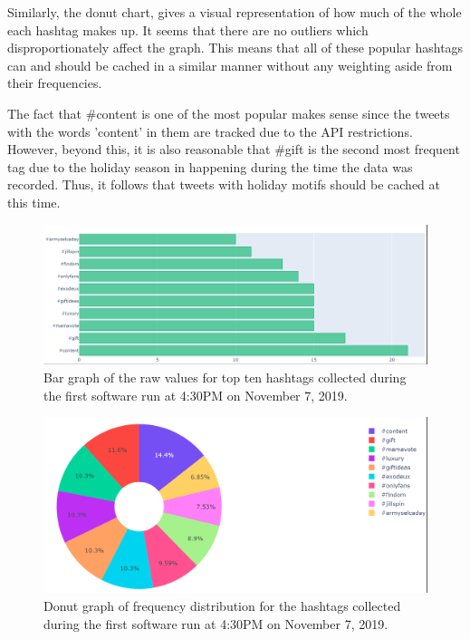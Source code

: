 \documentclass[conference]{IEEEtran}
\begin{document}
Similarly, the donut chart, gives a visual representation of how much of the whole each hashtag makes up. It seems that there are no outliers which disproportionately affect the graph. This means that all of these popular hashtags can and should be cached in a similar manner without any weighting aside from their frequencies. \par

The fact that \#content is one of the most popular makes sense since the tweets with the words 'content' in them are tracked due to the API restrictions. However, beyond this, it is also reasonable that \#gift is the second most frequent tag due to the holiday season in happening during the time the data was recorded. Thus, it follows that tweets with holiday motifs should be cached at this time. \par

\begin{figure}
    \hspace*{-1cm}
    \includegraphics[scale=0.35]{img/bar_run1.PNG}
    \caption{Bar graph of the raw values for top ten hashtags collected during the first software run at 4:30PM on November 7, 2019.}
    \label{fig:bar_run1}
\end{figure}

\begin{figure}
    \hspace*{-1cm}
    \includegraphics[scale=0.45]{img/donut_run1.PNG}
    \caption{Donut graph of frequency distribution for the hashtags collected during the first software run at 4:30PM on November 7, 2019.}
    \label{fig:donut_run1}
\end{figure}
\end{document}
